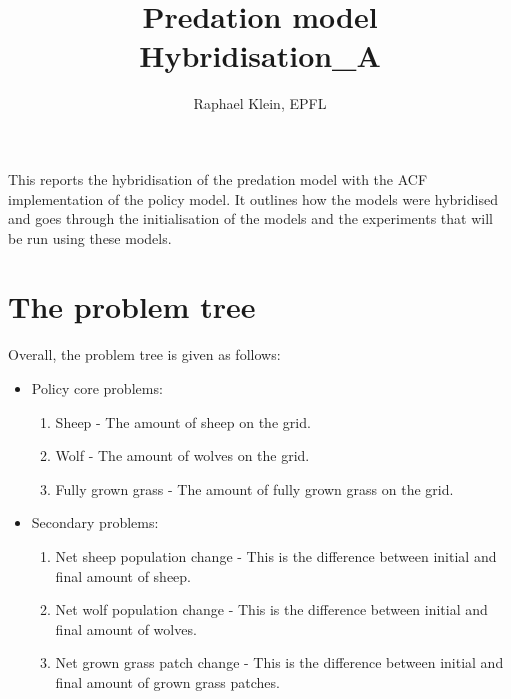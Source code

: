 \documentclass[12pt]{article}
\title{Predation model \\ Hybridisation\_A}
\author{Raphael Klein, EPFL}
\begin{document}
\maketitle


This reports the hybridisation of the predation model with the ACF implementation of the policy model. It outlines how the models were hybridised and goes through the initialisation of the models and the experiments that will be run using these models.

\section{The problem tree}
\label{sec:interfaceProblemTree}

Overall, the problem tree is given as follows:

\begin{itemize}
\item Policy core problems:
	\begin{enumerate}
	
	\item Sheep - 
	The amount of sheep on the grid.
	
	\item Wolf - 
	The amount of wolves on the grid.
	
	\item Fully grown grass - 
	The amount of fully grown grass on the grid.
	
	\end{enumerate}
	
\item Secondary problems:
	\begin{enumerate}

	\item Net sheep population change - 
	This is the difference between initial and final amount of sheep.
	
	\item Net wolf population change - 
	This is the difference between initial and final amount of wolves.
	
	\item Net grown grass patch change - 
	This is the difference between initial and final amount of grown grass patches.
	
	\end{enumerate}
	
\end{itemize}
\end{document}
